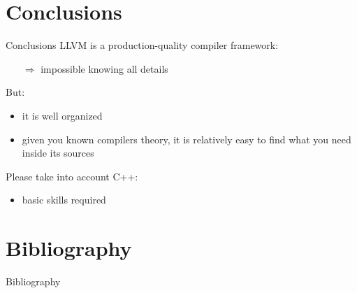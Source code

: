 \documentclass[10pt,mathserif]{beamer}
\begin{document}
\section{Conclusions}
\begin{frame}{Conclusions}
LLVM is a \alert{production-quality} compiler framework:

\begin{itemize}
\item[$\Rightarrow$] impossible knowing all details
\end{itemize}

\vfill
But:

\begin{itemize}
\item it is well organized
\item given you known compilers theory, it is relatively easy to find what you need inside its sources
\end{itemize}

\vfill
Please take into account C++:
\begin{itemize}
\item basic skills required
\end{itemize}
\end{frame}

\section{Bibliography}
\begin{frame}[allowframebreaks]{Bibliography}
\nocite{*}


\end{frame}
\end{document}
